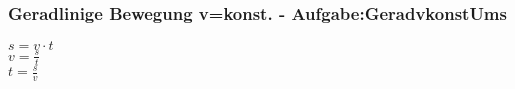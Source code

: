 \subsubsection{Geradlinige Bewegung v=konst. - Aufgabe:GeradvkonstUms} 
\begin{minipage}{0.45\textwidth} 
$ s = v\cdot t $\\ 
$ v = \frac{s}{t} $\\ 
$ t = \frac{s}{v} $\\ 
\end{minipage} 
\begin{minipage}{0.45\textwidth} 
 
\end{minipage} 
